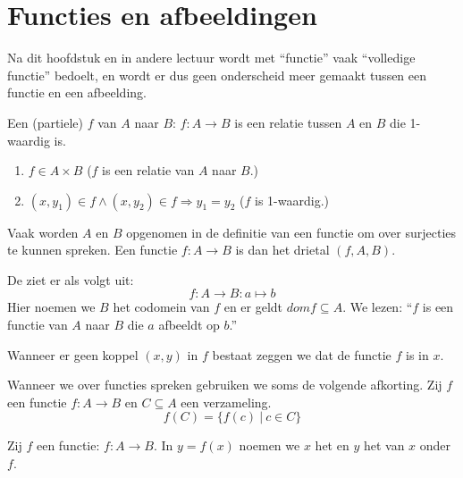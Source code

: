 \documentclass[main.tex]{subfiles}
\begin{document}
\chapter{Functies en afbeeldingen}
\label{cha:functies-en-afbeeldingen}

\begin{opm}
  Na dit hoofdstuk en in andere lectuur wordt met ``functie'' vaak ``volledige functie'' bedoelt, en wordt er dus geen onderscheid meer gemaakt tussen een functie en een afbeelding.
\end{opm}

\begin{de}
  Een (partiele)  $f$ van $A$ naar $B$: $f: A \rightarrow B$ is een relatie tussen $A$ en $B$ die 1-waardig is.
  \begin{enumerate}
  \item $f \in A \times B$ ($f$ is een relatie van $A$ naar $B$.)
  \item $(x,y_{1}) \in f \wedge (x,y_{2}) \in f \Rightarrow y_{1} = y_{2}$ ($f$ is 1-waardig.)
  \end{enumerate}
  Vaak worden $A$ en $B$ opgenomen in de definitie van een functie om over surjecties te kunnen spreken. Een functie $f: A \rightarrow B$ is dan het drietal $(f,A,B)$.
\end{de}

\begin{de}
  De  ziet er als volgt uit:
  \[ f: A \rightarrow B: a \mapsto b \]
  Hier noemen we $B$ het codomein van $f$ en er geldt $dom f \subseteq A$.
  We lezen: ``$f$ is een functie van $A$ naar $B$ die $a$ afbeeldt op $b$.''
\end{de}

\begin{de}
  Wanneer er geen koppel $(x,y)$ in $f$ bestaat zeggen we dat de functie $f$  is in $x$.
\end{de}

\begin{de}
  Wanneer we over functies spreken gebruiken we soms de volgende afkorting. Zij $f$ een functie $f: A \rightarrow B$ en $C \subseteq A$ een verzameling.
  \[ f(C) = \{ f(c)\ |\ c \in C \} \] 
\end{de}

\begin{de}
  Zij $f$ een functie: $f: A \rightarrow B$. 
  In $y = f(x)$ noemen we $x$ het  en $y$ het  van $x$ onder $f$.
\end{de}
\end{document}
